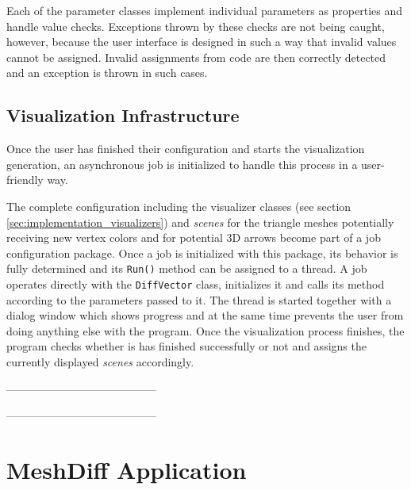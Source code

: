 
Each of the parameter classes implement individual parameters as properties and handle value checks. Exceptions thrown by these checks are not being caught, however, because the user interface is designed in such a way that invalid values cannot be assigned. Invalid assignments from code are then correctly detected and an exception is thrown in such cases.
\subsection{Visualization Infrastructure}

Once the user has finished their configuration and starts the visualization generation, an asynchronous job is initialized to handle this process in a user-friendly way.

The complete configuration including the visualizer classes (see section \ref{sec:implementation_visualizers}) and {\it scenes} for the triangle meshes potentially receiving new vertex colors and for potential 3D arrows become part of a job configuration package. Once a job is initialized with this package, its behavior is fully determined and its \verb+Run()+ method can be assigned to a thread. A job operates directly with the \verb+DiffVector+ class, initializes it and calls its method according to the parameters passed to it. The thread is started together with a dialog window which shows progress and at the same time prevents the user from doing anything else with the program. Once the visualization process finishes, the program checks whether is has finished successfully or not and assigns the currently displayed {\it scenes} accordingly.

-----------------------------------------

-----------------------------------------
\section{MeshDiff Application}


